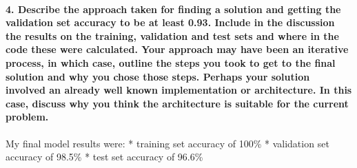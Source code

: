 \documentclass[11pt]{article}
\begin{document}
\hypertarget{describe-the-approach-taken-for-finding-a-solution-and-getting-the-validation-set-accuracy-to-be-at-least-0.93.-include-in-the-discussion-the-results-on-the-training-validation-and-test-sets-and-where-in-the-code-these-were-calculated.-your-approach-may-have-been-an-iterative-process-in-which-case-outline-the-steps-you-took-to-get-to-the-final-solution-and-why-you-chose-those-steps.-perhaps-your-solution-involved-an-already-well-known-implementation-or-architecture.-in-this-case-discuss-why-you-think-the-architecture-is-suitable-for-the-current-problem.}{%
\paragraph{4. Describe the approach taken for finding a solution and
getting the validation set accuracy to be at least 0.93. Include in the
discussion the results on the training, validation and test sets and
where in the code these were calculated. Your approach may have been an
iterative process, in which case, outline the steps you took to get to
the final solution and why you chose those steps. Perhaps your solution
involved an already well known implementation or architecture. In this
case, discuss why you think the architecture is suitable for the current
problem.}\label{describe-the-approach-taken-for-finding-a-solution-and-getting-the-validation-set-accuracy-to-be-at-least-0.93.-include-in-the-discussion-the-results-on-the-training-validation-and-test-sets-and-where-in-the-code-these-were-calculated.-your-approach-may-have-been-an-iterative-process-in-which-case-outline-the-steps-you-took-to-get-to-the-final-solution-and-why-you-chose-those-steps.-perhaps-your-solution-involved-an-already-well-known-implementation-or-architecture.-in-this-case-discuss-why-you-think-the-architecture-is-suitable-for-the-current-problem.}}

My final model results were: * training set accuracy of 100\% *
validation set accuracy of 98.5\% * test set accuracy of 96.6\%
\end{document}
